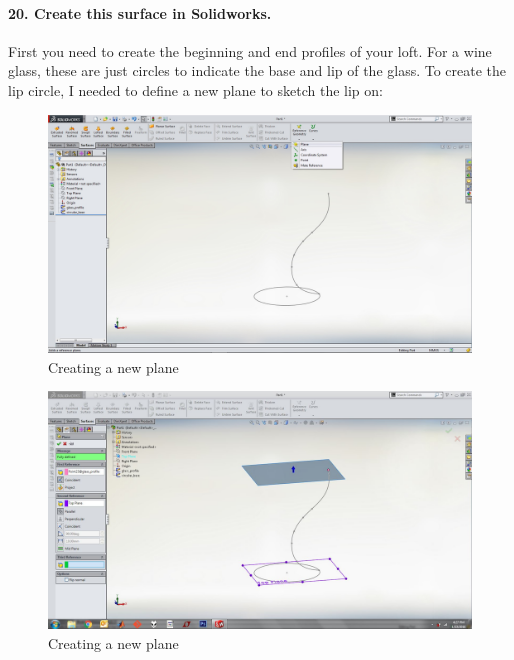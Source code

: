 \documentclass{article}
\begin{document}
\paragraph{20. Create this surface in Solidworks.} 

First you need to create the beginning and end profiles of your loft. For a wine glass, these are just circles to indicate the base and lip of the glass. To create the lip circle, I needed to define a new plane to sketch the lip on:

\begin{figure}[h!]
    \centering
    \includegraphics[width=1\textwidth]{figs_and_code/QEA_plane1}
    \caption{Creating a new plane}
\end{figure}

\begin{figure}[h!]
    \centering
    \includegraphics[width=1\textwidth]{figs_and_code/QEA_plane2}
    \caption{Creating a new plane}
\end{figure}
\end{document}
